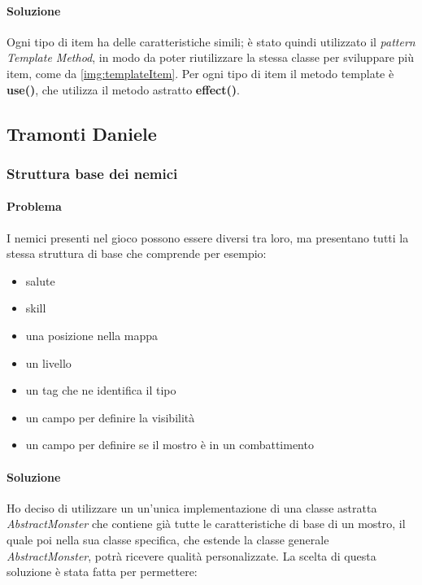 \documentclass{report}
\begin{document}
\paragraph{Soluzione} Ogni tipo di item ha delle caratteristiche simili; è stato quindi utilizzato il \textit{pattern Template Method}, in modo da poter riutilizzare la stessa classe per sviluppare più item, come da \ref{img:templateItem}.
%
Per ogni tipo di item il metodo template è \textbf{use()}, che utilizza il metodo astratto \textbf{effect()}. 

\subsection{Tramonti Daniele}

\subsubsection{Struttura base dei nemici}

\paragraph{Problema} I nemici presenti nel gioco possono essere diversi tra loro, ma presentano tutti la stessa struttura di base che comprende per esempio:

\begin{itemize}
    \item salute
    \item skill
    \item una posizione nella mappa
    \item un livello
    \item un tag che ne identifica il tipo
    \item un campo per definire la visibilità
    \item un campo per definire se il mostro è in un combattimento
\end{itemize}

\paragraph{Soluzione} Ho deciso di utilizzare un un'unica implementazione di una classe astratta \textit{AbstractMonster} che contiene già tutte le caratteristiche di base di un mostro, il quale poi nella sua classe
%
specifica, che estende la classe generale \textit{AbstractMonster}, potrà ricevere qualità personalizzate. La scelta di questa soluzione è stata fatta per permettere:
\end{document}
